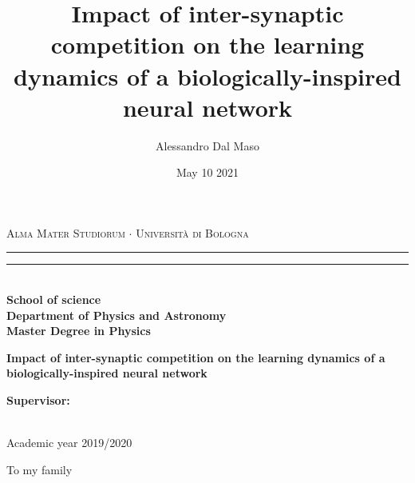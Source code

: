 \documentclass[a4paper]{report}
\title{Impact of inter-synaptic competition on the learning dynamics of a biologically-inspired neural network}
\author{Alessandro Dal Maso}
\date{May 10 2021}
\begin{document}
\begin{titlepage}
\begin{center}
{{\Large{\textsc{Alma Mater Studiorum $\cdot$ Universit\`a di Bologna}}}}
\rule[0.1cm]{15.8cm}{0.1mm}
\rule[0.5cm]{15.8cm}{0.6mm}
\\\vspace{3mm}
{\small{\bf School of science \\
Department of Physics and Astronomy\\
Master Degree in Physics}}
\end{center}
\vspace{23mm}
\begin{center}{
{\LARGE{\bf Impact of inter-synaptic competition on the learning dynamics of a biologically-inspired neural network}}\\
}\end{center}
\vspace{50mm} \par \noindent
\begin{minipage}[t]{0.47\textwidth}
{\large{\bf Supervisor: \vspace{2mm}{
\newline Prof. Enrico Giampieri}\\\\}}
\end{minipage}
%
\hfill
%
\begin{minipage}[t]{0.47\textwidth}
\end{minipage}
\vspace{40mm}
\begin{center}
Academic year{ 2019/2020}
\end{center}
\end{titlepage}

\newenvironment{dedication}
  {\clearpage           %
   \thispagestyle{empty}%
   \vspace*{\stretch{1}}%
   \itshape             %
   \raggedleft          %
  }
  {\par %
   \vspace{\stretch{3}} %
   \clearpage           %
  }

\begin{dedication}
To my family
\end{dedication}
\end{document}
